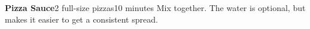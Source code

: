 \documentclass[../Cookbook.tex]{subfiles}
\begin{document}
\begin{recipe}[PizzaSauce]{\textbf{Pizza Sauce}}{2 full-size pizzas}{10 minutes}
	Mix together. The water is optional, but makes it easier to get a consistent spread.
\end{recipe}
\end{document}
